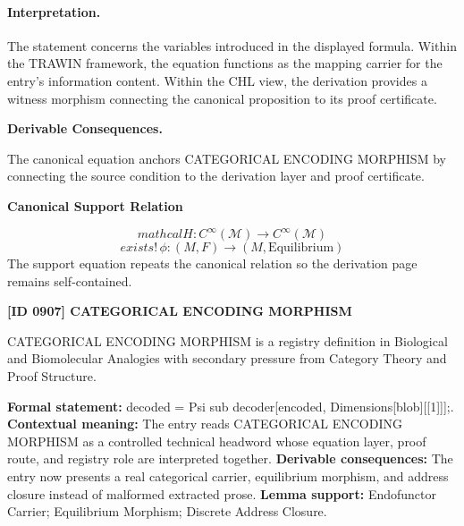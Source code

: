 \paragraph{Interpretation.}
The statement concerns the variables introduced in the displayed formula. Within the TRAWIN framework, the equation functions as the mapping carrier for the entry’s information content. Within the CHL view, the derivation provides a witness morphism connecting the canonical proposition to its proof certificate.

\par\vspace{0.35em}
\noindent\textbf{Derivable Consequences.}\quad
\begingroup
\footnotesize
\raggedright
The canonical equation anchors CATEGORICAL ENCODING MORPHISM by connecting the source condition to the derivation layer and proof certificate.
\par\endgroup

\noindent\textbf{Canonical Support Relation}\par
\[
mathcal{H}\colon C^{\infty}(\mathcal{M}) \to C^{\infty}(\mathcal{M})
\]
\[
exists!\,\phi\colon (M,F) \to (M,\mathrm{Equilibrium})
\]
\noindent The support equation repeats the canonical relation so the derivation page remains self-contained.\par

\clearpage
\noindent\textbf{[ID 0907] CATEGORICAL ENCODING MORPHISM}\par
\vspace{0.35em}
\begingroup\small
{}
CATEGORICAL ENCODING MORPHISM is a registry definition in Biological and Biomolecular Analogies with secondary pressure from Category Theory and Proof Structure.

\begingroup\footnotesize\setlength{\emergencystretch}{3em}\sloppy
\textbf{Formal statement:} decoded = Psi sub decoder[encoded, Dimensions[blob][[1]]];. \textbf{Contextual meaning:} The entry reads CATEGORICAL ENCODING MORPHISM as a controlled technical headword whose equation layer, proof route, and registry role are interpreted together. \textbf{Derivable consequences:} The entry now presents a real categorical carrier, equilibrium morphism, and address closure instead of malformed extracted prose. \textbf{Lemma support:} Endofunctor Carrier; Equilibrium Morphism; Discrete Address Closure.\par
\endgroup

